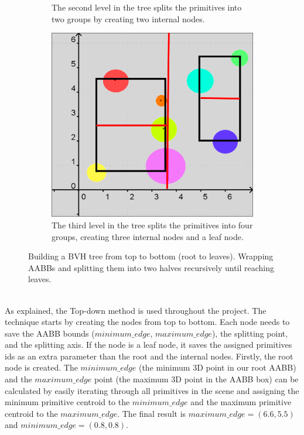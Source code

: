 \documentclass[11pt,a4paper]{article}
\begin{document}
\begin{figure}[h]
\begin{subfigure}[t]{0.3\textwidth}
         \captionsetup{justification=centering,margin=0.1cm}
         \caption{The second level in the tree splits the primitives into two groups by creating two internal nodes.}
         \label{fig:pi_5000}
     \end{subfigure}
     \hfill
     \begin{subfigure}[t]{0.3\textwidth}
         \centering
         \includegraphics[width=\textwidth]{images/example_bvh/4_g.png}
         \captionsetup{justification=centering,margin=0.1cm}
         \caption{The third level in the tree splits the primitives into four groups, creating three internal nodes and a leaf node.}
         \label{fig:pi_18000}
     \end{subfigure}
        \captionsetup{justification=centering,margin=2cm}
        \caption{Building a BVH tree from top to bottom (root to leaves). Wrapping AABBs and splitting them into two halves recursively until reaching leaves.}
        \label{fig:three graphs}
\end{figure}

\noindent
\\
As explained, the Top-down method is used throughout the project. The technique starts by creating the nodes from top to bottom. Each node needs to save the AABB bounds ($minimum\_edge$, $maximum\_edge$), the splitting point, and the splitting axis. If the node is a leaf node, it saves the assigned primitives ids as an extra parameter than the root and the internal nodes. Firstly, the root node is created. The $minimum\_edge$ (the minimum 3D point in our root AABB) and the $maximum\_edge$ point (the maximum 3D point in the AABB box) can be calculated by easily iterating through all primitives in the scene and assigning the minimum primitive centroid to the  $minimum\_edge$ and the maximum primitive centroid to the $maximum\_edge$. The final result is $maximum\_edge = (6.6, 5.5)$ and  $minimum\_edge = (0.8,0.8)$.
\end{document}
